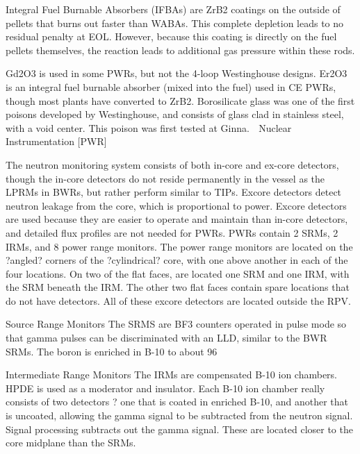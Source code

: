 \documentclass[10pt]{article}
\begin{document}
Integral Fuel Burnable Absorbers (IFBAs) are ZrB2 coatings on the outside of pellets that burns out faster than WABAs. This complete depletion leads to no residual penalty at EOL. However, because this coating is directly on the fuel pellets themselves, the  reaction leads to additional gas pressure within these rods. 

Gd2O3 is used in some PWRs, but not the 4-loop Westinghouse designs. Er2O3 is an integral fuel burnable absorber (mixed into the fuel) used in CE PWRs, though most plants have converted to ZrB2. Borosilicate glass was one of the first poisons developed by Westinghouse, and consists of glass clad in stainless steel, with a void center. This poison was first tested at Ginna. 

Nuclear Instrumentation [PWR]

The neutron monitoring system consists of both in-core and ex-core detectors, though the in-core detectors do not reside permanently in the vessel as the LPRMs in BWRs, but rather perform similar to TIPs. Excore detectors detect neutron leakage from the core, which is proportional to power. Excore detectors are used because they are easier to operate and maintain than in-core detectors, and detailed flux profiles are not needed for PWRs. PWRs contain 2 SRMs, 2 IRMs, and 8 power range monitors. The power range monitors are located on the ?angled? corners of the ?cylindrical? core, with one above another in each of the four locations. On two of the flat faces, are located one SRM and one IRM, with the SRM beneath the IRM. The other two flat faces contain spare locations that do not have detectors. All of these excore detectors are located outside the RPV. 

Source Range Monitors
The SRMS are BF3 counters operated in pulse mode so that gamma pulses can be discriminated with an LLD, similar to the BWR SRMs. The boron is enriched in B-10 to about 96%

Intermediate Range Monitors
The IRMs are compensated B-10 ion chambers. HPDE is used as a moderator and insulator. Each B-10 ion chamber really consists of two detectors ? one that is coated in enriched B-10, and another that is uncoated, allowing the gamma signal to be subtracted from the neutron signal. Signal processing subtracts out the gamma signal. These are located closer to the core midplane than the SRMs. 
\end{document}
